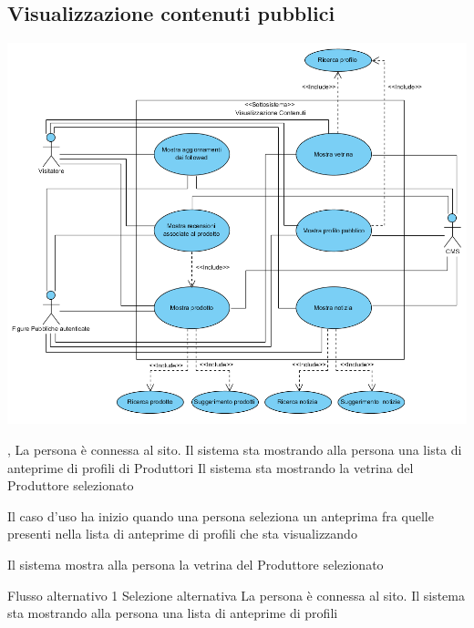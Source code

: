 \subsection{Visualizzazione contenuti pubblici}
\begin{center}
   \includegraphics[width=\textwidth]{assets/visualParadigm/cu/Visualizzazione}
\end{center}
{, }
{La persona è connessa al sito. Il sistema sta mostrando alla persona una lista di anteprime di profili di Produttori}
{Il sistema sta mostrando la vetrina del Produttore selezionato}
{\begin{enumCU}
	\item Il caso d'uso ha inizio quando una persona seleziona un anteprima fra quelle presenti nella lista di anteprime di profili che sta visualizzando\label{cu:mostraVetr1}
	\item Il sistema mostra alla persona la vetrina del Produttore selezionato
\end{enumCU}
}
%
%
{Flusso alternativo 1}%
{Selezione alternativa}%
{La persona è connessa al sito. Il sistema sta mostrando alla persona una lista di anteprime di profili}%
